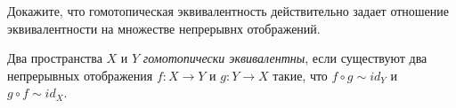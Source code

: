 \begin{testquestion}
	Докажите, что гомотопическая эквивалентность действительно задает отношение эквивалентности на множестве непрерывнх отображений.
\end{testquestion}

\begin{definition}
	Два пространства $X$ и $Y$ \emph{гомотопически эквивалентны}, если существуют два непрерывных отображения $f \colon X \to Y$ и $g \colon Y \to X$ такие, что $f \circ g \sim id_Y$ и $g \circ f \sim id_X$. 
\end{definition}
